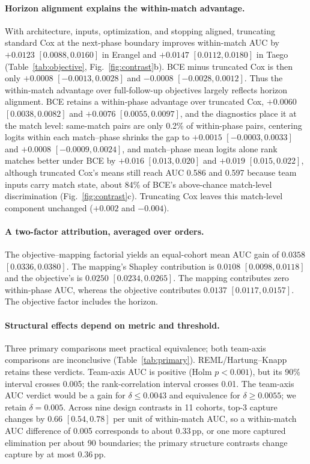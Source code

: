 \documentclass[sigconf,anonymous,nonacm]{acmart}
\begin{document}
\paragraph{Horizon alignment explains the within-match advantage.}

With architecture, inputs, optimization, and stopping aligned, truncating standard Cox at the next-phase boundary improves within-match AUC by $+0.0123$ $[0.0088,\allowbreak 0.0160]$ in Erangel and $+0.0147$ $[0.0112,\allowbreak 0.0180]$ in Taego (Table~\ref{tab:objective}, Fig.~\ref{fig:contrast}b). BCE minus truncated Cox is then only $+0.0008$ $[-0.0013,\allowbreak 0.0028]$ and $-0.0008$ $[-0.0028,\allowbreak 0.0012]$. Thus the within-match advantage over full-follow-up objectives largely reflects horizon alignment. BCE retains a within-phase advantage over truncated Cox, $+0.0060$ $[0.0038,\allowbreak 0.0082]$ and $+0.0076$ $[0.0055,\allowbreak 0.0097]$, and the diagnostics place it at the match level: same-match pairs are only 0.2\% of within-phase pairs, centering logits within each match--phase shrinks the gap to $+0.0015$ $[-0.0003,\allowbreak 0.0033]$ and $+0.0008$ $[-0.0009,\allowbreak 0.0024]$, and match--phase mean logits alone rank matches better under BCE by $+0.016$ $[0.013,\allowbreak 0.020]$ and $+0.019$ $[0.015,\allowbreak 0.022]$, although truncated Cox's means still reach AUC 0.586 and 0.597 because team inputs carry match state, about 84\% of BCE's above-chance match-level discrimination (Fig.~\ref{fig:contrast}c). Truncating Cox leaves this match-level component unchanged ($+0.002$ and $-0.004$).

\paragraph{A two-factor attribution, averaged over orders.}
The objective--mapping factorial yields an equal-cohort mean AUC gain of $0.0358$ $[0.0336,\allowbreak 0.0380]$. The mapping's Shapley contribution is $0.0108$ $[0.0098,\allowbreak 0.0118]$ and the objective's is $0.0250$ $[0.0234,\allowbreak 0.0265]$. The mapping contributes zero within-phase AUC, whereas the objective contributes $0.0137$ $[0.0117,\allowbreak 0.0157]$. The objective factor includes the horizon.

\paragraph{Structural effects depend on metric and threshold.}

Three primary comparisons meet practical equivalence; both team-axis comparisons are inconclusive (Table~\ref{tab:primary}). REML/Hartung--Knapp retains these verdicts. Team-axis AUC is positive (Holm $p<0.001$), but its 90\% interval crosses 0.005; the rank-correlation interval crosses 0.01. The team-axis AUC verdict would be a gain for $\delta\le0.0043$ and equivalence for $\delta\ge0.0055$; we retain $\delta=0.005$. Across nine design contrasts in 11 cohorts, top-3 capture changes by 0.66 $[0.54,\allowbreak 0.78]$ per unit of within-match AUC, so a within-match AUC difference of 0.005 corresponds to about 0.33\,pp, or one more captured elimination per about 90 boundaries; the primary structure contrasts change capture by at most 0.36\,pp.
\end{document}

